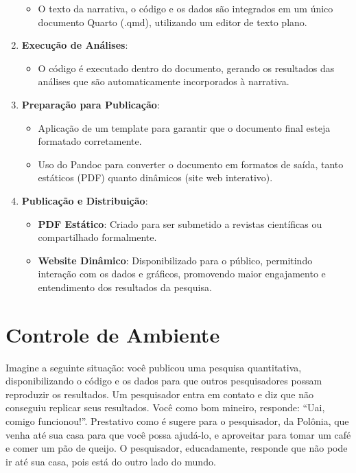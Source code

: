 \documentclass[
  a4paper,
]{book}
\providecommand{\tightlist}{%
  \setlength{\itemsep}{0pt}\setlength{\parskip}{0pt}}\usepackage{longtable,booktabs,array}
\begin{document}
\begin{tcolorbox}
\begin{enumerate}
  \begin{itemize}
  \tightlist
  \item
    O texto da narrativa, o código e os dados são integrados em um único
    documento Quarto (.qmd), utilizando um editor de texto plano.
  \end{itemize}
\item
  \textbf{Execução de Análises}:

  \begin{itemize}
  \tightlist
  \item
    O código é executado dentro do documento, gerando os resultados das
    análises que são automaticamente incorporados à narrativa.
  \end{itemize}
\item
  \textbf{Preparação para Publicação}:

  \begin{itemize}
  \tightlist
  \item
    Aplicação de um template para garantir que o documento final esteja
    formatado corretamente.
  \item
    Uso do Pandoc para converter o documento em formatos de saída, tanto
    estáticos (PDF) quanto dinâmicos (site web interativo).
  \end{itemize}
\item
  \textbf{Publicação e Distribuição}:

  \begin{itemize}
  \tightlist
  \item
    \textbf{PDF Estático}: Criado para ser submetido a revistas
    científicas ou compartilhado formalmente.
  \item
    \textbf{Website Dinâmico}: Disponibilizado para o público,
    permitindo interação com os dados e gráficos, promovendo maior
    engajamento e entendimento dos resultados da pesquisa.
  \end{itemize}
\end{enumerate}

\end{tcolorbox}


\chapter{Controle de Ambiente}\label{sec-docker}

Imagine a seguinte situação: você publicou uma pesquisa quantitativa,
disponibilizando o código e os dados para que outros pesquisadores
possam reproduzir os resultados. Um pesquisador entra em contato e diz
que não conseguiu replicar seus resultados. Você como bom mineiro,
responde: ``Uai, comigo funcionou!''. Prestativo como é sugere para o
pesquisador, da Polônia, que venha até sua casa para que você possa
ajudá-lo, e aproveitar para tomar um café e comer um pão de queijo. O
pesquisador, educadamente, responde que não pode ir até sua casa, pois
está do outro lado do mundo.
\end{document}
